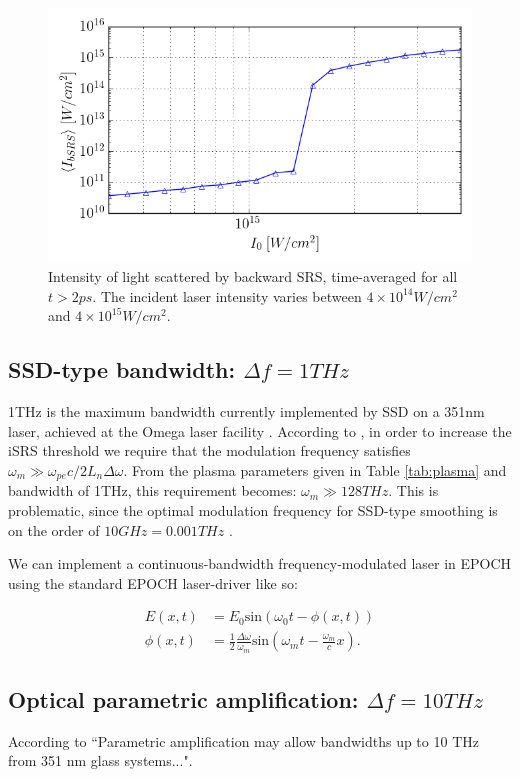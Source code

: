 \begin{figure}[ht]
   \centering
    \includegraphics[width=0.75\columnwidth]{Chapters/C5_broadband/351nm_threshold.png}
    \caption{Intensity of light scattered by backward SRS, time-averaged for all $t>2\si{ps}$. The incident laser intensity varies between $4\times10^{14}\si{W/cm^2}$ and $4\times10^{15}\si{W/cm^2}$.}
    \label{fig:351nm_base_threshold}
\end{figure}{}

\subsection{SSD-type bandwidth: $\Delta f=1\si{THz}$}
1THz is the maximum bandwidth currently implemented by SSD on a 351nm laser, achieved at the Omega laser facility \citep{Regan2005}. According to \citet{Wen2021}, in order to increase the iSRS threshold we require that the modulation frequency satisfies $\omega_m \gg \omega_{pe} c / 2L_n\Delta\omega$. From the plasma parameters given in Table \ref{tab:plasma} and bandwidth of 1THz, this requirement becomes: $\omega_m \gg 128  \si{THz}$. This is problematic, since the optimal modulation frequency for SSD-type smoothing is on the order of $10 \si{GHz} = 0.001 \si{THz}$ \citep{Regan2005,Kelly2013}.

We can implement a continuous-bandwidth frequency-modulated laser in EPOCH using the standard EPOCH laser-driver like so:

\begin{equation}
\begin{aligned}
   E(x,t) &= E_0\text{sin}\left(\omega_0 t - \phi(x,t)\right) \\
   \phi(x,t) &= \frac{1}{2}\frac{\Delta\omega}{\omega_m}\text{sin}\left(\omega_mt - \frac{\omega_m}{c}x\right).
\end{aligned}
\end{equation}

\subsection{Optical parametric amplification: $\Delta f=10\si{THz}$}
According to \citet{Lehmberg2020} ``Parametric amplification may allow bandwidths up to 10 THz from 351 nm glass systems...".


